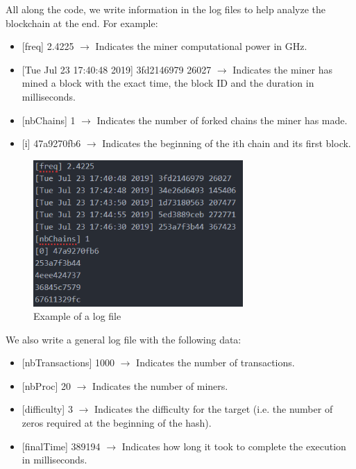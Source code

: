 All along the code, we write information in the log files to help analyze the blockchain at the end. For example: \newline

\begin{itemize}
  \item {[freq]} 2.4225  $\rightarrow$ Indicates the miner computational power in GHz.
  \item {[Tue Jul 23 17:40:48 2019]} 3fd2146979 26027 $\rightarrow$ Indicates the miner has mined a block with the exact time, the block ID and the duration in milliseconds.
  \item {[nbChains]} 1 $\rightarrow$ Indicates the number of forked chains the miner has made.
  \item {[i]} 47a9270fb6 $\rightarrow$ Indicates the beginning of the ith chain and its first block.
\end{itemize}
\medskip

\begin{figure}[ht]
\centering
\includegraphics[width=8cm]{Figures/logExample}
\caption{Example of a log file}
\end{figure}
\medskip

We also write a general log file with the following data: \newline

\begin{itemize}
  \item {[nbTransactions]} 1000 $\rightarrow$ Indicates the number of transactions.
  \item {[nbProc]} 20 $\rightarrow$ Indicates the number of miners.
  \item {[difficulty]} 3 $\rightarrow$ Indicates the difficulty for the target (i.e. the number of zeros required at the beginning of the hash).
  \item {[finalTime]} 389194 $\rightarrow$ Indicates how long it took to complete the execution in milliseconds.
\end{itemize}



